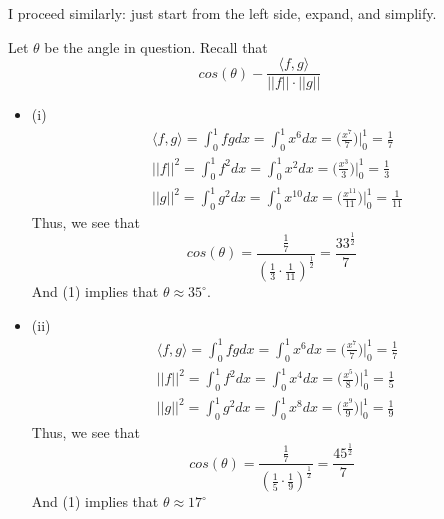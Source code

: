 \documentclass[12pt]{article}
\newenvironment{problem}[2][Problem]{\begin{trivlist}
\item[\hskip \labelsep {\bfseries #1}\hskip \labelsep {\bfseries #2.}]}{\end{trivlist}}
\theoremstyle{definition}
\theoremstyle{definition}
\theoremstyle{definition}
\theoremstyle{definition}
\begin{document}
\begin{problem}{3.2}
I proceed similarly: just start from the left side, expand, and simplify.
\end{problem}

\begin{problem}{3.3}
Let $\theta$ be the angle in question. Recall that $$ cos(\theta) - \frac{\langle f, g \rangle}{||f|| \cdot ||g||} $$
\begin{itemize}
\item (i)
\begin{align*}
&\langle f,g \rangle = \int_0^1 fg dx = \int_0^1 x^6 dx = \bigg(\frac{x^7}{7} \bigg) \bigg\vert_0^1 = \frac{1}{7} \\
&||f||^2 = \int_0^1 f^2 dx = \int_0^1 x^2 dx = \bigg(\frac{x^3}{3} \bigg) \bigg\vert_0^1 = \frac{1}{3} \\
&||g||^2 = \int_0^1 g^2 dx = \int_0^1 x^10 dx = \bigg(\frac{x^{11}}{11}\bigg) \bigg\vert_0^1 = \frac{1}{11}
\end{align*}
Thus, we see that 
\begin{equation}
cos(\theta) = \frac{\frac{1}{7}}{(\frac{1}{3} \cdot \frac{1}{11}) ^\frac{1}{2}} = \frac{33^{\frac{1}{2}}}{7}
\end{equation}
And (1) implies that $\theta \approx 35^{\circ}$. 
\item (ii)
\begin{align*}
&\langle f,g \rangle = \int_0^1 fg dx = \int_0^1 x^6 dx = \bigg(\frac{x^7}{7} \bigg) \bigg\vert_0^1 = \frac{1}{7} \\
&||f||^2 = \int_0^1 f^2 dx = \int_0^1 x^4 dx = \bigg(\frac{x^5}{8} \bigg) \bigg\vert_0^1 = \frac{1}{5} \\
&||g||^2 = \int_0^1 g^2 dx = \int_0^1 x^8 dx = \bigg(\frac{x^{9}}{9}\bigg) \bigg\vert_0^1 = \frac{1}{9}
\end{align*}
Thus, we see that 
\begin{equation}
cos(\theta) = \frac{\frac{1}{7}}{(\frac{1}{5} \cdot \frac{1}{9}) ^\frac{1}{2}} = \frac{45^{\frac{1}{2}}}{7}
\end{equation}
And (1) implies that $\theta \approx 17^{\circ}$
\end{itemize}
\end{problem}
\end{document}
